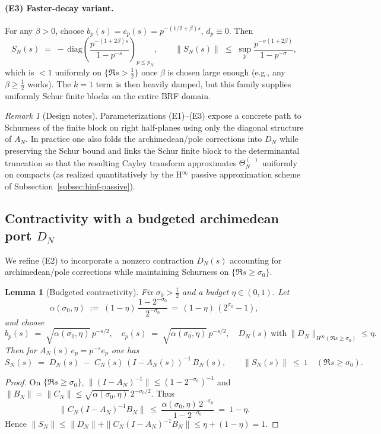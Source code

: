 \documentclass[11pt]{article}
\newtheorem{lemma}[theorem]{Lemma}
\theoremstyle{remark}
\newtheorem{remark}[theorem]{Remark}
\DeclareMathOperator{\dettwo}{det_2}
\begin{document}
\paragraph{(E3) Faster-decay variant.}
For any $\beta>0$, choose $b_p(s)=c_p(s)=p^{-(1/2+\beta)s}$, $d_p\equiv 0$. Then
\[
 S_N(s)\;=\;-\,\mathrm{diag}\!\left(\frac{p^{-(1+2\beta)s}}{1-p^{-s}}\right)_{p\le p_N},\qquad \|S_N(s)\|\;\le\;\sup_p\frac{p^{-\sigma(1+2\beta)}}{1-p^{-\sigma}},
\]
which is $<1$ uniformly on $\{\Re s>\tfrac12\}$ once $\beta$ is chosen large enough (e.g., any $\beta\ge \tfrac12$ works). The $k=1$ term is then heavily damped, but this family supplies uniformly Schur finite blocks on the entire BRF domain.

\begin{remark}[Design notes]
Parameterizations (E1)–(E3) expose a concrete path to Schurness of the finite block on right half-planes using only the diagonal structure of $A_N$. In practice one also folds the archimedean/pole corrections into $D_N$ while preserving the Schur bound and links the Schur finite block to the determinantal truncation so that the resulting Cayley transform approximates $\Theta_N^{(\dettwo)}$ uniformly on compacts (as realized quantitatively by the H$^\infty$ passive approximation scheme of Subsection~\ref{subsec:hinf-passive}).
\end{remark}

\subsection{Contractivity with a budgeted archimedean port $D_N$}\label{subsec:DN-budget}
We refine (E2) to incorporate a nonzero contraction $D_N(s)$ accounting for archimedean/pole corrections while maintaining Schurness on $\{\Re s\ge \sigma_0\}$.

\begin{lemma}[Budgeted contractivity]\label{lem:budget}
Fix $\sigma_0>\tfrac12$ and a budget $\eta\in(0,1)$. Let
\[
 \alpha(\sigma_0,\eta)\;:=\;(1-\eta)\,\frac{1-2^{-\sigma_0}}{2^{-\sigma_0}}\,=\,(1-\eta)\,(2^{\sigma_0}-1),
\]
and choose
\[
 b_p(s)\;=\;\sqrt{\alpha(\sigma_0,\eta)}\,p^{-s/2},\quad c_p(s)\;=\;\sqrt{\alpha(\sigma_0,\eta)}\,p^{-s/2},\quad D_N(s)\ \text{with}\ \|D_N\|_{H^\infty(\Re s\ge \sigma_0)}\le \eta.
\]
Then for $A_N(s)\,e_p=p^{-s}e_p$ one has
\[
 S_N(s)\;=\;D_N(s)\; -\; C_N(s)\,(I-A_N(s))^{-1}\,B_N(s),\qquad \|S_N(s)\|\ \le\ 1\quad (\Re s\ge \sigma_0).
\]
\end{lemma}
\begin{proof}
On $\{\Re s\ge \sigma_0\}$, $\|(I-A_N)^{-1}\|\le (1-2^{-\sigma_0})^{-1}$ and $\|B_N\|=\|C_N\|\le \sqrt{\alpha(\sigma_0,\eta)}\,2^{-\sigma_0/2}$. Thus
\[
 \|C_N(I-A_N)^{-1}B_N\|\ \le\ \frac{\alpha(\sigma_0,\eta)\,2^{-\sigma_0}}{1-2^{-\sigma_0}}\ =\ 1-\eta.
\]
Hence $\|S_N\|\le \|D_N\|+\|C_N(I-A_N)^{-1}B_N\|\le \eta+(1-\eta)=1$.
\end{proof}
\end{document}
